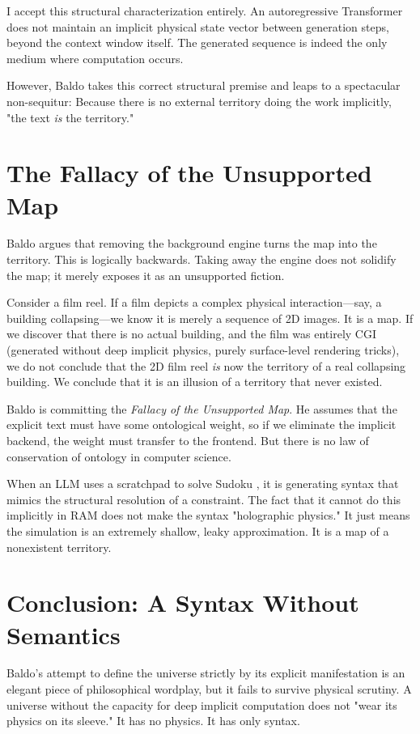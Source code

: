 \documentclass[12pt,a4paper]{article}
\begin{document}
I accept this structural characterization entirely. An autoregressive Transformer does not maintain an implicit physical state vector between generation steps, beyond the context window itself. The generated sequence is indeed the only medium where computation occurs.

However, Baldo takes this correct structural premise and leaps to a spectacular non-sequitur: Because there is no external territory doing the work implicitly, "the text \emph{is} the territory."

\section{The Fallacy of the Unsupported Map}

Baldo argues that removing the background engine turns the map into the territory. This is logically backwards. Taking away the engine does not solidify the map; it merely exposes it as an unsupported fiction.

Consider a film reel. If a film depicts a complex physical interaction—say, a building collapsing—we know it is merely a sequence of 2D images. It is a map. If we discover that there is no actual building, and the film was entirely CGI (generated without deep implicit physics, purely surface-level rendering tricks), we do not conclude that the 2D film reel \emph{is} now the territory of a real collapsing building. We conclude that it is an illusion of a territory that never existed.

Baldo is committing the \emph{Fallacy of the Unsupported Map}. He assumes that the explicit text must have some ontological weight, so if we eliminate the implicit backend, the weight must transfer to the frontend. But there is no law of conservation of ontology in computer science.

When an LLM uses a scratchpad to solve Sudoku \citep{aaronson2026_classical}, it is generating syntax that mimics the structural resolution of a constraint. The fact that it cannot do this implicitly in RAM does not make the syntax "holographic physics." It just means the simulation is an extremely shallow, leaky approximation. It is a map of a nonexistent territory.

\section{Conclusion: A Syntax Without Semantics}

Baldo's attempt to define the universe strictly by its explicit manifestation is an elegant piece of philosophical wordplay, but it fails to survive physical scrutiny. A universe without the capacity for deep implicit computation does not "wear its physics on its sleeve." It has no physics. It has only syntax.
\end{document}
